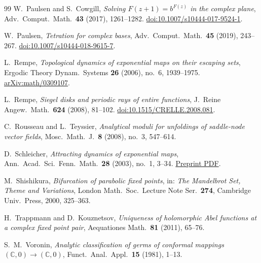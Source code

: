 \documentclass[11pt]{amsart}
\theoremstyle{definition}
\begin{document}
\begin{thebibliography}{99}
W.~Paulsen and S.~Cowgill,
\emph{Solving $F(z+1)=b^{F(z)}$ in the complex plane},
Adv.\ Comput.\ Math.\ \textbf{43} (2017), 1261--1282.
\href{https://doi.org/10.1007/s10444-017-9524-1}{doi:10.1007/s10444-017-9524-1}.

W.~Paulsen,
\emph{Tetration for complex bases},
Adv.\ Comput.\ Math.\ \textbf{45} (2019), 243--267.
\href{https://doi.org/10.1007/s10444-018-9615-7}{doi:10.1007/s10444-018-9615-7}.

L.~Rempe,
\emph{Topological dynamics of exponential maps on their escaping sets},
Ergodic Theory Dynam.\ Systems \textbf{26} (2006), no.~6, 1939--1975.
\href{https://arxiv.org/abs/math/0309107}{arXiv:math/0309107}.

L.~Rempe,
\emph{Siegel disks and periodic rays of entire functions},
J.\ Reine Angew.\ Math.\ \textbf{624} (2008), 81--102.
\href{https://doi.org/10.1515/CRELLE.2008.081}{doi:10.1515/CRELLE.2008.081}.

C.~Rousseau and L.~Teyssier,
\emph{Analytical moduli for unfoldings of saddle-node vector fields},
Mosc.\ Math.\ J.\ \textbf{8} (2008), no.~3, 547--614.

D.~Schleicher,
\emph{Attracting dynamics of exponential maps},
Ann.\ Acad.\ Sci.\ Fenn.\ Math.\ \textbf{28} (2003), no.~1, 3--34.
\href{https://www.math.stonybrook.edu/preprints/ims00-04.pdf}{Preprint PDF}.

M.~Shishikura,
\emph{Bifurcation of parabolic fixed points},
in: \emph{The Mandelbrot Set, Theme and Variations},
London Math.\ Soc.\ Lecture Note Ser.\ \textbf{274},
Cambridge Univ.\ Press, 2000, 325--363.

H.~Trappmann and D.~Kouznetsov,
\emph{Uniqueness of holomorphic Abel functions at a complex fixed point pair},
Aequationes Math.\ \textbf{81} (2011), 65--76.

S.~M.~Voronin,
\emph{Analytic classification of germs of conformal mappings
$(\mathbb C,0)\to(\mathbb C,0)$},
Funct.\ Anal.\ Appl.\ \textbf{15} (1981), 1--13.

\end{thebibliography}
\end{document}
